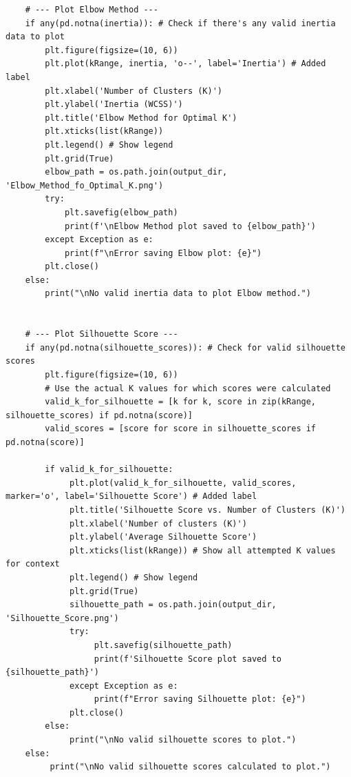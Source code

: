 \documentclass[12pt]{report}
\begin{document}
{{{\begin{lstlisting}
    # --- Plot Elbow Method ---
    if any(pd.notna(inertia)): # Check if there's any valid inertia data to plot
        plt.figure(figsize=(10, 6))
        plt.plot(kRange, inertia, 'o--', label='Inertia') # Added label
        plt.xlabel('Number of Clusters (K)')
        plt.ylabel('Inertia (WCSS)')
        plt.title('Elbow Method for Optimal K')
        plt.xticks(list(kRange))
        plt.legend() # Show legend
        plt.grid(True)
        elbow_path = os.path.join(output_dir, 'Elbow_Method_fo_Optimal_K.png')
        try:
            plt.savefig(elbow_path)
            print(f'\nElbow Method plot saved to {elbow_path}')
        except Exception as e:
            print(f"\nError saving Elbow plot: {e}")
        plt.close()
    else:
        print("\nNo valid inertia data to plot Elbow method.")


    # --- Plot Silhouette Score ---
    if any(pd.notna(silhouette_scores)): # Check for valid silhouette scores
        plt.figure(figsize=(10, 6))
        # Use the actual K values for which scores were calculated
        valid_k_for_silhouette = [k for k, score in zip(kRange, silhouette_scores) if pd.notna(score)]
        valid_scores = [score for score in silhouette_scores if pd.notna(score)]

        if valid_k_for_silhouette:
             plt.plot(valid_k_for_silhouette, valid_scores, marker='o', label='Silhouette Score') # Added label
             plt.title('Silhouette Score vs. Number of Clusters (K)')
             plt.xlabel('Number of clusters (K)')
             plt.ylabel('Average Silhouette Score')
             plt.xticks(list(kRange)) # Show all attempted K values for context
             plt.legend() # Show legend
             plt.grid(True)
             silhouette_path = os.path.join(output_dir, 'Silhouette_Score.png')
             try:
                  plt.savefig(silhouette_path)
                  print(f'Silhouette Score plot saved to {silhouette_path}')
             except Exception as e:
                  print(f"Error saving Silhouette plot: {e}")
             plt.close()
        else:
             print("\nNo valid silhouette scores to plot.")
    else:
         print("\nNo valid silhouette scores calculated to plot.")


\end{lstlisting}}}}
\end{document}
